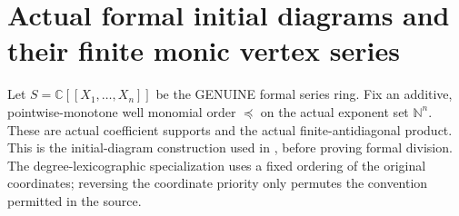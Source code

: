 \section{Actual formal initial diagrams and their finite monic vertex series}

Let $S=\mathbb C[[X_1,\ldots,X_n]]$ be the GENUINE formal series ring.
Fix an additive, pointwise-monotone well monomial order $\preceq$ on the
actual exponent set $\mathbb N^n$. These are actual coefficient supports
and the actual finite-antidiagonal product. This is the initial-diagram
construction used in \cite[\S3, \S7, pp.~261--264]{bierstone-milman97-invent-math},
before proving formal division. The degree-lexicographic specialization
uses a fixed ordering of the original coordinates; reversing the coordinate
priority only permutes the convention permitted in the source.

